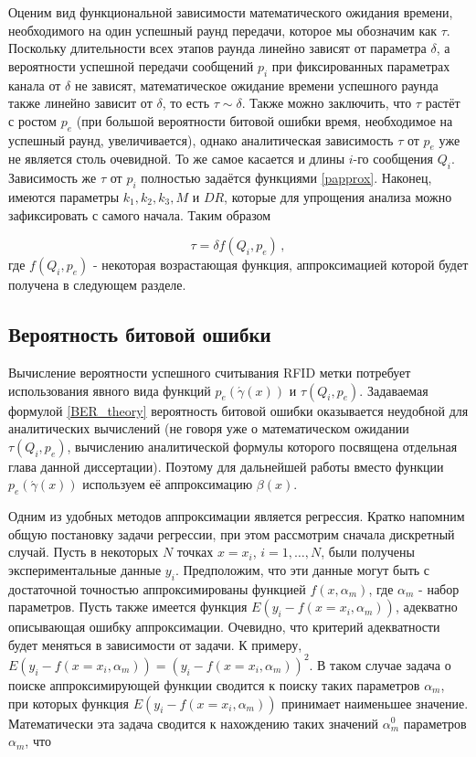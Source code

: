\documentclass[12pt]{article}
\theoremstyle{definition}
\begin{document}
Оценим вид функциональной зависимости математического ожидания времени, необходимого на один успешный раунд передачи, которое мы обозначим как $\tau$. Поскольку длительности всех этапов раунда линейно зависят от параметра $\delta$, а вероятности успешной передачи сообщений $p_i$ при фиксированных параметрах канала от $\delta$ не зависят, математическое ожидание времени успешного раунда также линейно зависит от $\delta$, то есть $\tau\sim\delta$. Также можно заключить, что $\tau$ растёт с ростом $p_e$ (при большой вероятности битовой ошибки время, необходимое на успешный раунд, увеличивается), однако аналитическая зависимость $\tau$ от $p_e$ уже не является столь очевидной. То же самое касается и длины $i$-го сообщения $Q_i$. Зависимость же $\tau$ от $p_i$ полностью задаётся функциями \eqref{papprox}. Наконец, имеются параметры $k_1,k_2,k_3,M$ и $DR$, которые для упрощения анализа можно зафиксировать с самого начала. Таким образом

\begin{equation}
\label{tau-pre-approx}
    \tau = \delta f(Q_i,p_e)\,,
\end{equation}
где $f(Q_i,p_e)$ - некоторая возрастающая функция, аппроксимацией которой будет получена в следующем разделе.


\subsection{Вероятность битовой ошибки}
\label{sec:ch23}

Вычисление вероятности успешного считывания RFID метки потребует использования явного вида функций $p_e(\acute{\gamma}(x))$ и $\tau(Q_i,p_e)$. Задаваемая формулой \eqref{BER_theory} вероятность битовой ошибки оказывается неудобной для аналитических вычислений (не говоря уже о математическом ожидании $\tau(Q_i,p_e)$, вычислению аналитической формулы которого посвящена отдельная глава данной диссертации). Поэтому для дальнейшей работы вместо функции $p_e(\acute{\gamma}(x))$ используем её аппроксимацию $\beta(x)$.

Одним из удобных методов аппроксимации является регрессия. Кратко напомним общую постановку задачи регрессии, при этом рассмотрим сначала дискретный случай. Пусть в некоторых $N$ точках $x=x_i$, $i=1,\ldots, N$, были получены экспериментальные данные $y_i$. Предположим, что эти данные могут быть с достаточной точностью аппроксимированы функцией $f(x,\alpha_m)$, где $\alpha_m$ - набор параметров. Пусть также имеется функция $E(y_i - f(x=x_i,\alpha_m))$, адекватно описывающая ошибку аппроксимации. Очевидно, что критерий адекватности будет меняться в зависимости от задачи. К примеру, $E(y_i - f(x=x_i,\alpha_m)) = (y_i - f(x=x_i,\alpha_m))^2$. В таком случае задача о поиске аппроксимирующей функции сводится к поиску таких параметров $\alpha_m$, при которых функция $E(y_i - f(x=x_i,\alpha_m))$ принимает наименьшее значение. Математически эта задача сводится к нахождению таких значений $\alpha_m^0$ параметров $\alpha_m$, что
\end{document}

